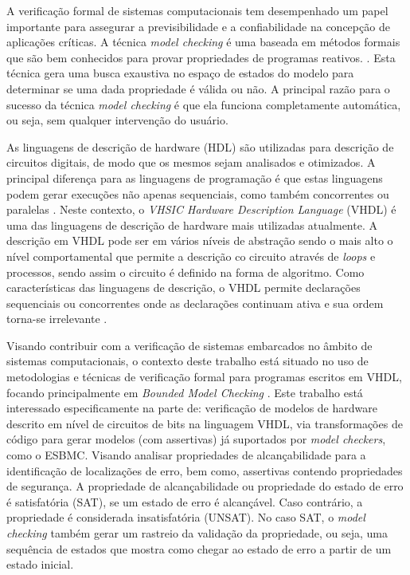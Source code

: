 \par
A verificação formal de sistemas computacionais tem desempenhado um papel importante para assegurar a previsibilidade e a confiabilidade na concepção de aplicações críticas. A técnica \textit{model checking} é uma baseada em métodos formais que são bem conhecidos para provar propriedades de programas reativos. \cite{bensalem1999automatic}. Esta técnica gera uma busca exaustiva no espaço de estados do modelo para determinar se uma dada propriedade é válida ou não\cite{baier2008principles}. A principal razão para o sucesso da técnica \textit{model checking} é que ela funciona completamente automática, ou seja, sem qualquer intervenção do usuário.

\par
As linguagens de descrição de hardware (HDL) são utilizadas para descrição de circuitos digitais, de modo que os mesmos sejam analisados e otimizados. A principal diferença para as linguagens de programação é que estas linguagens podem gerar execuções não apenas sequenciais, como também concorrentes ou paralelas \cite{chu2006rtl}. Neste contexto, o \textit{VHSIC Hardware Description Language} (VHDL) é uma das linguagens de descrição de hardware mais utilizadas atualmente. A descrição em VHDL pode ser em vários níveis de abstração sendo o mais alto o nível comportamental que permite a descrição co circuito através de \textit{loops} e processos, sendo assim o circuito é definido na forma de algoritmo. Como características das linguagens de descrição, o VHDL permite declarações sequenciais ou concorrentes onde as declarações continuam ativa e sua ordem torna-se irrelevante \cite{cappelattipraticando}.

\par
Visando contribuir com a verificação de sistemas embarcados no âmbito de sistemas computacionais, o contexto deste trabalho está situado no uso de metodologias e técnicas de verificação formal para programas escritos em VHDL\cite{biere2016aiger}, focando principalmente em \textit{Bounded Model Checking} \cite{cordeiro2012smt,rocha2015model}. Este trabalho está interessado especificamente na parte de: verificação de modelos de hardware descrito em nível de circuitos de bits na linguagem VHDL, via transformações de código para gerar modelos (com assertivas) já suportados por \textit{model checkers}, como o ESBMC\cite{cordeiro2012smt}. Visando analisar propriedades de alcançabilidade para a identificação de localizações de erro, bem como, assertivas contendo propriedades de segurança. A propriedade de alcançabilidade ou propriedade do estado de erro é satisfatória (SAT), se um estado de erro é alcançável. Caso contrário, a propriedade é considerada insatisfatória (UNSAT). No caso SAT, o \textit{model checking} também gerar um rastreio da validação da propriedade, ou seja, uma sequência de estados que mostra como chegar ao estado de erro a partir de um estado inicial.



